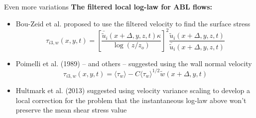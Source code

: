 \begin{frame}{Even more variations}
\textbf{The filtered local log-law for ABL flows:}
\begin{itemize}
	\item Bou-Zeid et al. proposed to use the filtered velocity to find the surface stress
	$$\tau_{i3,w}(x,y,t) = \left[ \frac{\bar{\tilde{u}}_i (x+\Delta,y,z,t)\kappa}{\log(z/z_o)}\right]^2 \frac{\tilde{u}_i (x+\Delta,y,z,t)}{\bar{\tilde{u}}_i (x+\Delta,y,z,t)}$$ 
	\item Poimelli et al. (1989) -- and others -- suggested using the wall normal velocity
	$$\tau_{i3,w}(x,y,t) = \langle \tau_w \rangle - C\langle \tau_w \rangle^{1/2} \tilde{w}(x+\Delta,y,t)$$
	\item  Hultmark et al. (2013) suggested using velocity variance scaling to develop a local correction for the problem that the instantaneous log-law above won't preserve the mean shear stress value
\end{itemize}
\end{frame}




